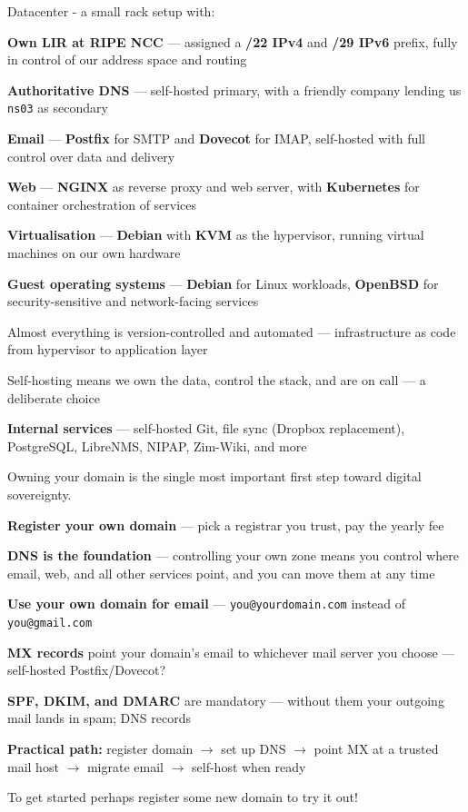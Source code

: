 \documentclass[Screen16to9,17pt]{foils}
\begin{document}
Datacenter - a small rack setup with:
\begin{list2}
\item {\bf Own LIR at RIPE NCC} — assigned a {\bf /22 IPv4} and {\bf /29 IPv6} prefix,
fully in control of our address space and routing
\item {\bf Authoritative DNS} — self-hosted primary, with a friendly company
lending us \verb+ns03+ as secondary
\item {\bf Email} — {\bf Postfix} for SMTP and {\bf Dovecot} for IMAP,
self-hosted with full control over data and delivery
\item {\bf Web} — {\bf NGINX} as reverse proxy and web server,
with {\bf Kubernetes} for container orchestration of services
\item {\bf Virtualisation} — {\bf Debian} with {\bf KVM} as the hypervisor,
running virtual machines on our own hardware
\item {\bf Guest operating systems} — {\bf Debian} for Linux workloads,
{\bf OpenBSD} for security-sensitive and network-facing services
\item Almost everything is version-controlled and automated — infrastructure as code
from hypervisor to application layer
\item Self-hosting means we own the data, control the stack,
and are on call — a deliberate choice
\item {\bf Internal services} — self-hosted Git, file sync (Dropbox replacement),
PostgreSQL, LibreNMS, NIPAP, Zim-Wiki, and more
\end{list2}



Owning your domain is the single most important first step toward digital sovereignty.

\begin{list2}
\item {\bf Register your own domain} — pick a registrar you trust, pay the yearly fee
\item {\bf DNS is the foundation} — controlling your own zone means you control
where email, web, and all other services point, and you can move them at any time
\item {\bf Use your own domain for email} — \verb+you@yourdomain.com+ instead of
\verb+you@gmail.com+
\item {\bf MX records} point your domain's email to whichever mail server you choose —
self-hosted Postfix/Dovecot?
\item {\bf SPF, DKIM, and DMARC} are mandatory — without them your outgoing mail
lands in spam; DNS records
\item {\bf Practical path:} register domain $\rightarrow$ set up DNS $\rightarrow$
point MX at a trusted mail host $\rightarrow$ migrate email $\rightarrow$
self-host when ready
\item To get started perhaps register some new domain to try it out!
\end{list2}
\end{document}
